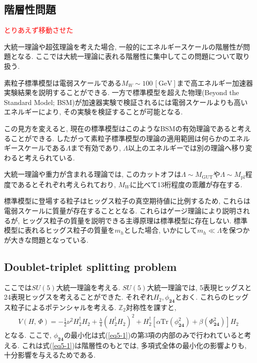 \subsection{階層性問題}
\textcolor{red}{とりあえず移動させた}

大統一理論や超弦理論を考えた場合, 一般的にエネルギースケールの階層性が問題となる.
ここでは大統一理論に表れる階層性に集中してこの問題について取り扱う.

素粒子標準模型は電弱スケールである$M_W\sim100\,[\mathrm{GeV}]$まで高エネルギー加速器実験結果を説明することができる.
一方で標準模型を超えた物理(Beyond the Standard Model; BSM)が加速器実験で検証されるには電弱スケールよりも高いエネルギーにより, その実験を検証することが可能となる.

この見方を変えると, 現在の標準模型はこのようなBSMの有効理論であると考えることができる.
したがって素粒子標準模型の理論の適用範囲は何らかのエネルギースケールである$\Lambda$まで有効であり, $\Lambda$以上のエネルギーでは別の理論へ移り変わると考えられている.

大統一理論や重力が含まれる理論では, このカットオフは$\Lambda\sim M_{\mathrm{GUT}}$や$\Lambda\sim M_{\mathrm{pl}}$程度であるとそれぞれ考えられており, $M_W$に比べて13桁程度の乖離が存在する.

標準模型に登場する粒子はヒッグス粒子の真空期待値に比例するため, これらは電弱スケールに質量が存在することとなる.
これらはゲージ理論により説明されるが, ヒッグス粒子の質量を説明できる主導原理は標準模型に存在しない.
標準模型に表れるヒッグス粒子の質量を$m_h$とした場合, いかにして$m_h \ll \Lambda$を保つかが大きな問題となっている.

\subsection{Doublet-triplet splitting problem}
ここでは$SU(5)$大統一理論を考える.
$SU(5)$大統一理論では, 5表現ヒッグスと24表現ヒッグスを考えることができた.
それぞれ$H_2$,\,$\phi_{\bm{24}}$とおく.
これらのヒッグス粒子によるポテンシャルを考える.
$\mathbb{Z}_2$対称性を課すと,
\begin{align}
  V(H,\,\Phi) = -\frac{1}{2}\nu^2 H_2^\dagger H_2 + \frac{\lambda}{4}(H_2^\dagger H_2)^2 + H_2^\dagger[\alpha \mathrm{Tr}(\phi_{\bm{24}}^2)+\beta(\Phi_{\bm{24}}^2)]H_2 \label{eq5-1} 
\end{align}
となる.
ここで, $\phi_{\bm{24}}$の最小化は式(\ref{eq5-1})の第3項の内部のみで行われていると考える.
これは式(\ref{eq5-1})は階層性のもとでは, 多項式全体の最小化の影響よりも, 十分影響を与えるためである.

